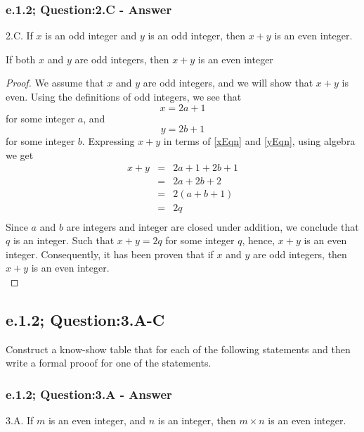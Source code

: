 \subsubsection*{e.1.2; Question:2.C - Answer}
2.C. If $x$ is an odd integer and $y$ is an odd integer, then $x + y$ is an even integer. \\

\begin{tcolorbox}
\begin{theorem}
If both $x$ and $y$ are odd integers, then $x + y$ is an even integer
\end{theorem}
\end{tcolorbox}

\begin{proof}
We assume that $x$ and $y$ are odd integers, and we will show that $x+y$ is even. Using the definitions of odd integers, we see that
\begin{equation}
\label{xEqn}
x = 2a + 1
\end{equation}
for some integer $a$, and
\begin{equation}
\label{yEqn}
y = 2b + 1
\end{equation}
for some integer $b$. Expressing $x+y$ in terms of \ref{xEqn} and \ref{yEqn}, using algebra we get
\begin{eqnarray*}
x + y & = & 2a + 1 + 2b + 1  \nonumber \\
& = & 2a + 2b + 2 \nonumber \\
& = & 2(a + b + 1) \nonumber \\
& = & 2q \nonumber \\
\end{eqnarray*}
Since $a$ and $b$ are integers and integer are closed under addition, we conclude that $q$ is an integer. Such that $x + y = 2q$ for some integer $q$, hence, $x + y$ is an even integer. Consequently, it has been proven that if $x$ and $y$ are odd integers, then $x + y$ is an even integer. \\
\end{proof}




\subsection{e.1.2; Question:3.A-C}
Construct a know-show table that for each of the following statements and then write a formal prooof for one of the statements. \\

\subsubsection*{e.1.2; Question:3.A - Answer}
3.A. If $m$ is an even integer, and $n$ is an integer, then $m \times n$ is an even integer. \\ 

